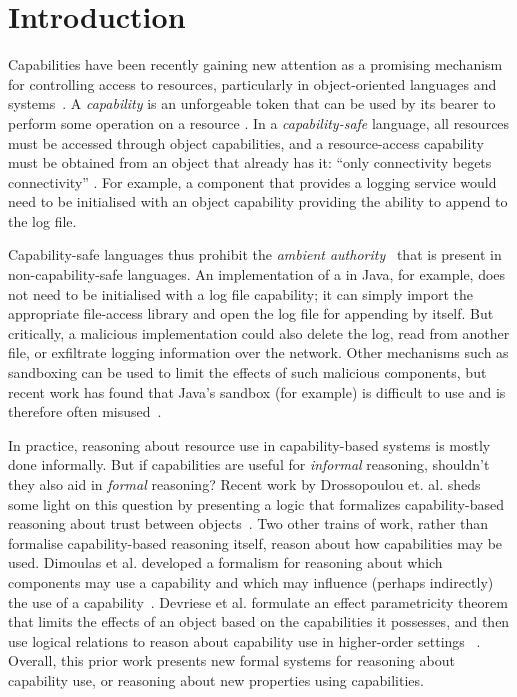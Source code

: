 \section{Introduction}

Capabilities have been recently gaining new attention as a promising
mechanism for controlling access to resources, particularly in
object-oriented languages and
systems~\cite{miller03,drossopoulou07,dimoulas14,devriese16}.  A
\textit{capability} is an unforgeable token that can be used by its
bearer to perform some operation on a resource \cite{dennis66}.  In a
\textit{capability-safe} language, all resources must be accessed
through object capabilities, and a resource-access capability must be
obtained from an object that already has it: ``only connectivity
begets connectivity'' \cite{miller03}.  For example, a 
component that provides a logging service would need to be initialised
with an object capability providing the ability to append to the log
file.

Capability-safe languages thus prohibit the \textit{ambient
  authority}~\cite{miller06} that is present in non-capability-safe
languages.  An implementation of a  in Java, for example,
does not need to be initialised with a log file capability; it can simply
import the appropriate file-access library and open the log file for
appending by itself. But critically, a malicious implementation could also
delete the log, read from another file, or exfiltrate logging information
over the network.  Other mechanisms such as sandboxing can be used
to limit the effects of such malicious components, but recent work has
found that Java's sandbox (for example) is difficult to use and is
therefore often misused~\cite{coker15,maass16}.

In practice, reasoning about resource use in capability-based systems
is mostly done informally.
But if capabilities are useful for \textit{informal} reasoning,
shouldn't they also aid in \textit{formal} reasoning?  Recent work by Drossopoulou et. al. sheds some light on this question by presenting a logic that
formalizes capability-based reasoning about trust between
objects~\cite{drossopoulou07}.  Two other trains of work, rather than
formalise capability-based reasoning itself, reason about how
capabilities may be used.  Dimoulas et al. developed a formalism for
reasoning about which components may use a capability and which may
influence (perhaps indirectly) the use of a
capability~\cite{dimoulas14}.  Devriese et al. formulate an effect
parametricity theorem that limits the effects of an object based on
the capabilities it possesses, and then use logical relations to
reason about capability use in higher-order settings~\cite{devriese16}
.  Overall, this prior work presents new formal systems for reasoning
about capability use, or reasoning about new properties using
capabilities.

